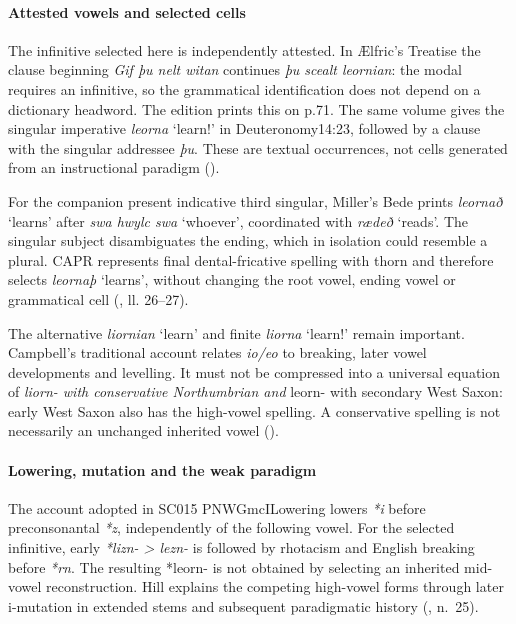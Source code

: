 \documentclass[
  british,
  a4paper,
]{article}
\begin{document}
\paragraph{Attested vowels and selected
cells}\label{attested-vowels-and-selected-cells}

The infinitive selected here is independently attested. In Ælfric's
Treatise the clause beginning \emph{Gif þu nelt witan} continues
\emph{þu scealt leornian}: the modal requires an infinitive, so the
grammatical identification does not depend on a dictionary headword. The
edition prints this on p.71. The same volume gives the singular
imperative \emph{leorna} `learn!' in Deuteronomy14:23, followed by a
clause with the singular addressee \emph{þu}. These are textual
occurrences, not cells generated from an instructional paradigm
().

For the companion present indicative third singular, Miller's Bede
prints \emph{leornað} `learns' after \emph{swa hwylc swa} `whoever',
coordinated with \emph{rædeð} `reads'. The singular subject
disambiguates the ending, which in isolation could resemble a plural.
CAPR represents final dental-fricative spelling with thorn and therefore
selects \emph{leornaþ} `learns', without changing the root vowel, ending
vowel or grammatical cell (,
ll. 26--27).

The alternative \emph{liornian} `learn' and finite \emph{liorna}
`learn!' remain important. Campbell's traditional account relates
\emph{io/eo} to breaking, later vowel developments and levelling. It
must not be compressed into a universal equation of \emph{liorn- with
conservative Northumbrian and }leorn- with secondary West Saxon: early
West Saxon also has the high-vowel spelling. A conservative spelling is
not necessarily an unchanged inherited vowel
().

\paragraph{Lowering, mutation and the weak
paradigm}\label{lowering-mutation-and-the-weak-paradigm}

The account adopted in SC015 PNWGmcILowering lowers \emph{*i} before
preconsonantal \emph{*z}, independently of the following vowel. For the
selected infinitive, early \emph{*lizn- > lezn-} is followed by
rhotacism and English breaking before \emph{*rn}. The resulting *leorn-
is not obtained by selecting an inherited mid-vowel reconstruction. Hill
explains the competing high-vowel forms through later i-mutation in
extended stems and subsequent paradigmatic history
(, n.~25).
\end{document}
